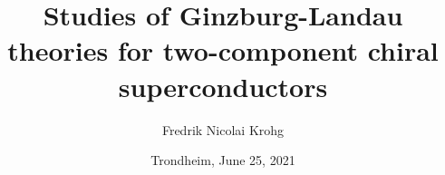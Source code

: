 

%
%



\author{Fredrik Nicolai Krohg}
\title{Studies of Ginzburg-Landau theories for two-component chiral superconductors}
\date{Trondheim, June 25, 2021}



    \maketitle
  \frontmatter
    
    
    
    
    \tableofcontents
  \mainmatter 
    
    
    
    
    
    
    
%    
     
  \backmatter
    \printbibliography
    

